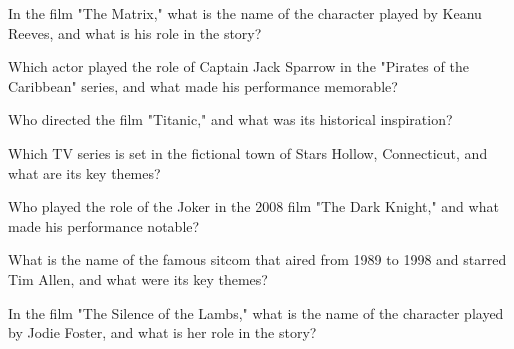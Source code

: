\documentclass[12pt,a4paper]{book}
\begin{document}
\begin{enhancedmcq}[Question 35]{In the film "The Matrix," what is the name of the character played by Keanu Reeves, and what is his role in the story?}
\end{enhancedmcq}

\begin{enhancedmcq}[Question 36]{Which actor played the role of Captain Jack Sparrow in the "Pirates of the Caribbean" series, and what made his performance memorable?}
\end{enhancedmcq}

\begin{enhancedmcq}[Question 37]{Who directed the film "Titanic," and what was its historical inspiration?}
\end{enhancedmcq}

\begin{enhancedmcq}[Question 38]{Which TV series is set in the fictional town of Stars Hollow, Connecticut, and what are its key themes?}
\end{enhancedmcq}

\begin{enhancedmcq}[Question 39]{Who played the role of the Joker in the 2008 film "The Dark Knight," and what made his performance notable?}
\end{enhancedmcq}

\begin{enhancedmcq}[Question 40]{What is the name of the famous sitcom that aired from 1989 to 1998 and starred Tim Allen, and what were its key themes?}
\end{enhancedmcq}

\begin{enhancedmcq}[Question 41]{In the film "The Silence of the Lambs," what is the name of the character played by Jodie Foster, and what is her role in the story?}
\end{enhancedmcq}
\end{document}
